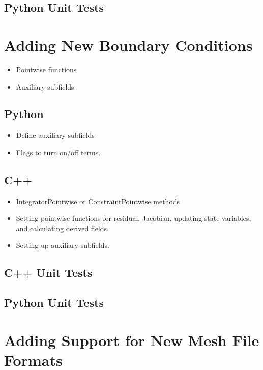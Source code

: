 \subsection{Python Unit Tests}


\section{Adding New Boundary Conditions}




\begin{itemize}
\item Pointwise functions
\item Auxiliary subfields
\end{itemize}

\subsection{Python}

\begin{itemize}
\item Define auxiliary subfields
\item Flags to turn on/off terms.
\end{itemize}

\subsection{C++}

\begin{itemize}
\item IntegratorPointwise or ConstraintPointwise methods
\item Setting pointwise functions for residual, Jacobian, updating
  state variables, and calculating derived fields.
\item Setting up auxiliary subfields.
\end{itemize}

\subsection{C++ Unit Tests}

\subsection{Python Unit Tests}


\section{Adding Support for New Mesh File Formats}

